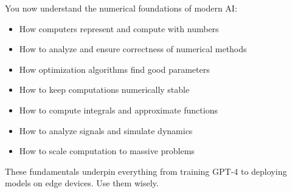 \vspace{2em}

You now understand the numerical foundations of modern AI:
\begin{itemize}
    \item How computers represent and compute with numbers
    \item How to analyze and ensure correctness of numerical methods
    \item How optimization algorithms find good parameters
    \item How to keep computations numerically stable
    \item How to compute integrals and approximate functions
    \item How to analyze signals and simulate dynamics
    \item How to scale computation to massive problems
\end{itemize}


These fundamentals underpin everything from training GPT-4 to deploying models on edge devices.
Use them wisely.



